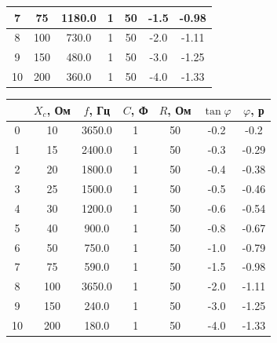 \documentclass[a4paper,12pt]{article}
\begin{document}
\begin{justify}
\begin{table}[htp]
\begin{tabular}{|c|c|c|c|c|c|c|}
7  & 75        & 1180.0  & 1      & 50      & -1.5          & -0.98        \\ \hline
8  & 100       & 730.0   & 1      & 50      & -2.0          & -1.11        \\ \hline
9  & 150       & 480.0   & 1      & 50      & -3.0          & -1.25        \\ \hline
10 & 200       & 360.0   & 1      & 50      & -4.0          & -1.33        \\ \hline
\end{tabular}
\end{table}
    \begin{table}[htp]
    \centering
\begin{tabular}{|c|c|c|c|c|c|c|}
\hline
   & $X_c$, Ом & $f$, Гц & $C$, Ф & $R$, Ом & $\tan\varphi$ & $\varphi$, р \\ \hline
0  & 10        & 3650.0  & 1      & 50      & -0.2          & -0.2         \\ \hline
1  & 15        & 2400.0  & 1      & 50      & -0.3          & -0.29        \\ \hline
2  & 20        & 1800.0  & 1      & 50      & -0.4          & -0.38        \\ \hline
3  & 25        & 1500.0  & 1      & 50      & -0.5          & -0.46        \\ \hline
4  & 30        & 1200.0  & 1      & 50      & -0.6          & -0.54        \\ \hline
5  & 40        & 900.0   & 1      & 50      & -0.8          & -0.67        \\ \hline
6  & 50        & 750.0   & 1      & 50      & -1.0          & -0.79        \\ \hline
7  & 75        & 590.0   & 1      & 50      & -1.5          & -0.98        \\ \hline
8  & 100       & 3650.0  & 1      & 50      & -2.0          & -1.11        \\ \hline
9  & 150       & 240.0   & 1      & 50      & -3.0          & -1.25        \\ \hline
10 & 200       & 180.0   & 1      & 50      & -4.0          & -1.33        \\ \hline
\end{tabular}
\end{table}

    
    
    
    
    
    
    
    

\end{justify}
\end{document}
